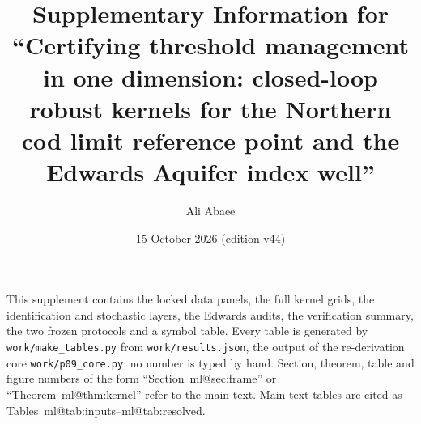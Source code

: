 \documentclass[11pt,a4paper]{article}
\title{\textbf{Supplementary Information for\\ ``Certifying threshold management in one dimension: closed-loop robust kernels for the Northern cod limit reference point and the Edwards Aquifer index well''}}
\author{Ali Abaee}
\date{15 October 2026 (edition v44)}
\makeatletter
\newcommand{\mref}[1]{\csname ml@#1\endcsname}
\makeatother
\begin{document}
\maketitle
\noindent This supplement contains the locked data panels, the full kernel grids, the identification and stochastic layers, the Edwards audits, the verification summary, the two frozen protocols and a symbol table. Every table is generated by \texttt{work/make\_tables.py} from \texttt{work/results.json}, the output of the re-derivation core \texttt{work/p09\_core.py}; no number is typed by hand. Section, theorem, table and figure numbers of the form ``Section~\mref{sec:frame}'' or ``Theorem~\mref{thm:kernel}'' refer to the main text. Main-text tables are cited as Tables~\mref{tab:inputs}--\mref{tab:resolved}.
\tableofcontents
\end{document}
